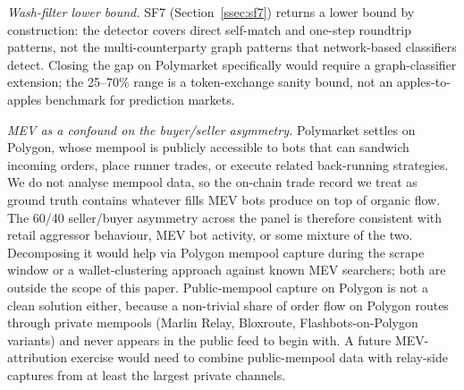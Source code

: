 \textit{Wash-filter lower bound.}
SF7 (Section~\ref{ssec:sf7}) returns a lower bound by construction:
the detector covers direct self-match and one-step roundtrip
patterns, not the multi-counterparty graph patterns that
network-based classifiers detect. Closing the gap on Polymarket
specifically would require a graph-classifier extension; the
\citet{cong-li-tang-yang-2023} 25--70\% range is a token-exchange sanity
bound, not an apples-to-apples benchmark for prediction markets.

\textit{MEV as a confound on the buyer/seller asymmetry.}
Polymarket settles on Polygon, whose mempool is publicly accessible
to bots that can sandwich incoming orders, place runner trades, or
execute related back-running strategies. We do not analyse mempool
data, so the on-chain trade record we treat as ground truth
contains whatever fills MEV bots produce on top of organic flow.
The 60/40 seller/buyer asymmetry across the panel is therefore
consistent with retail aggressor behaviour, MEV bot activity, or
some mixture of the two. Decomposing it would help via Polygon
mempool capture during the scrape window or a wallet-clustering
approach against known MEV searchers; both are outside the scope
of this paper. Public-mempool capture on Polygon is not a clean
solution either, because a non-trivial share of order flow on
Polygon routes through private mempools (Marlin Relay, Bloxroute,
Flashbots-on-Polygon variants) and never appears in the public feed
to begin with. A future MEV-attribution exercise would need to
combine public-mempool data with relay-side captures from at least
the largest private channels.
